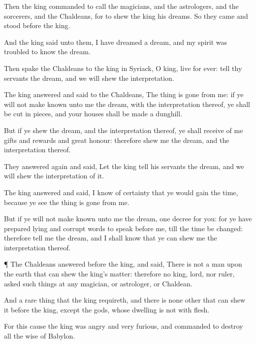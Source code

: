 {Then the
king
commanded to
call the
magicians, and the
astrologers, and the
sorcerers, and the
Chaldeans, for to
shew the
king his
dreams. So they
came and
stood
before the
king.

And the
king
said unto them, I have
dreamed a
dream, and my
spirit was
troubled to
know the
dream.

Then
spake the
Chaldeans to the
king in
Syriack, O
king,
live for
ever:
tell thy
servants the
dream, and we will
shew the
interpretation.

The
king
answered and
said to the
Chaldeans, The
thing is
gone from
me:
if ye will
not make
known unto me the
dream, with the
interpretation thereof, ye shall be
cut in
pieces, and your
houses shall be
made a
dunghill.

But
if ye
shew the
dream, and the
interpretation thereof, ye shall
receive
of
me
gifts and
rewards and
great
honour:
therefore
shew me the
dream, and the
interpretation thereof.

They
answered
again and
said, Let the
king
tell his
servants the
dream, and we will
shew the
interpretation of it.

The
king
answered and
said,
I
know
of
certainty that
ye would
gain the
time,
because ye
see the
thing is
gone
from me.

But
if ye will
not make
known unto me the
dream,
{}
one
decree for you: for ye have
prepared
lying and
corrupt
words to
speak
before me,
till the
time be
changed:
therefore
tell me the
dream, and I shall
know
that ye can
shew me the
interpretation thereof.


\par }{\PP {}¶ The
Chaldeans
answered
before the
king, and
said, There
is
not a
man
upon the
earth that
can
shew the
king’s
matter:
therefore
{}
no
king,
lord, nor
ruler,
{}
asked
such
things at
any
magician, or
astrologer, or
Chaldean.

And
{} a
rare
thing that the
king
requireth, and there
is
none
other that can
shew it
before the
king,
except the
gods, whose
dwelling
is
not
with
flesh.

For
this
cause the
king was
angry and
very
furious, and
commanded to
destroy
all the
wise
{} of
Babylon.

}
